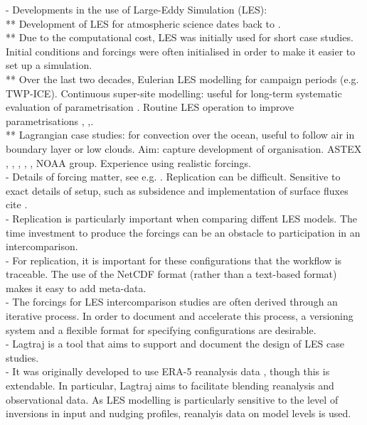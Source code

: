 \documentclass[a4paper,11pt]{article}
\begin{document}
- Developments in the use of Large-Eddy Simulation (LES): \\
** Development of LES for atmospheric science dates back to \cite{deardorff1970}. \\
** Due to the computational cost, LES was initially used for short
case studies. Initial conditions and forcings were often initialised in order
to make it easier to set up a simulation. \\
** Over the last two decades, Eulerian LES modelling for campaign
periods (e.g. TWP-ICE). Continuous super-site modelling: useful for
long-term systematic evaluation of parametrisation \cite{neggers2012}.
Routine LES operation to improve parametrisations
\cite{schalkwijk2015}, \cite{laar2019},\cite{gustafson2020}. \\
** Lagrangian case studies: for convection over the ocean, useful to
follow air in boundary layer or low clouds. Aim: capture development of
organisation. ASTEX \cite{bretherton1999}, \cite{roode2016},
\cite{tomassini2017}, \cite{mohrmann2019}, \cite{neggers2019}, NOAA
group. Experience using realistic forcings. \\
- Details of forcing matter, see e.g. \cite{smalley2019}. Replication
can be difficult. Sensitive to exact details of setup, such as
subsidence \citep{hohenegger2013,kurowski2020} and implementation of
surface fluxes cite \citep{stevens2001}. \\
- Replication is particularly important when comparing diffent LES
models. The time investment to produce the forcings can be an obstacle
to participation in an intercomparison. \\
- For replication, it is important for these configurations that the
workflow is traceable. The use of the NetCDF format (rather than a
text-based format) makes it easy to add meta-data. \\
- The forcings for LES intercomparison studies are often derived
through an iterative process. In order to document and accelerate this
process, a versioning system and a flexible format for specifying
configurations are desirable. \\
- Lagtraj is a tool that aims to support and document the design of LES
case studies. \\
- It was originally developed to use ERA-5 reanalysis data
\citep{hersbach2020}, though this is extendable. In particular, Lagtraj
aims to facilitate blending reanalysis and observational data. As LES
modelling is particularly sensitive to the level of inversions in input
and nudging profiles, reanalyis data on model levels is used. \\
\end{document}
